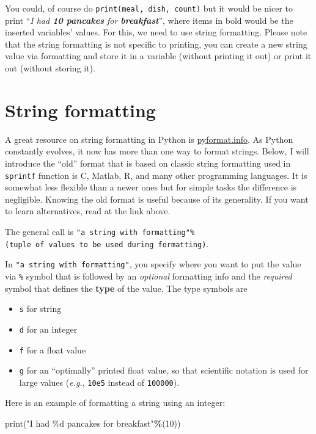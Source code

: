\documentclass[
]{book}
\newenvironment{Shaded}{\begin{snugshade}}{\end{snugshade}}
\newcommand{\BuiltInTok}[1]{#1}
\newcommand{\DecValTok}[1]{\textcolor[rgb]{0.00,0.00,0.81}{#1}}
\newcommand{\NormalTok}[1]{#1}
\newcommand{\OperatorTok}[1]{\textcolor[rgb]{0.81,0.36,0.00}{\textbf{#1}}}
\newcommand{\SpecialCharTok}[1]{\textcolor[rgb]{0.00,0.00,0.00}{#1}}
\newcommand{\StringTok}[1]{\textcolor[rgb]{0.31,0.60,0.02}{#1}}
\providecommand{\tightlist}{%
  \setlength{\itemsep}{0pt}\setlength{\parskip}{0pt}}
\begin{document}
You could, of course do \texttt{print(meal,\ dish,\ count)} but it would be nicer to print ``\emph{I had \textbf{10 pancakes} for \textbf{breakfast}}'', where items in bold would be the inserted variables' values. For this, we need to use string formatting. Please note that the string formatting is not specific to printing, you can create a new string value via formatting and store it in a variable (without printing it out) or print it out (without storing it).

\hypertarget{string-formatting}{%
\section{String formatting}\label{string-formatting}}

A great resource on string formatting in Python is \href{https://pyformat.info/}{pyformat.info}. As Python constantly evolves, it now has more than one way to format strings. Below, I will introduce the ``old'' format that is based on classic string formatting used in \texttt{sprintf} function is C, Matlab, R, and many other programming languages. It is somewhat less flexible than a newer ones but for simple tasks the difference is negligible. Knowing the old format is useful because of its generality. If you want to learn alternatives, read at the link above.

The general call is \texttt{"a\ string\ with\ formatting"\%(tuple\ of\ values\ to\ be\ used\ during\ formatting)}.

In \texttt{"a\ string\ with\ formatting"}, you specify where you want to put the value via \texttt{\%} symbol that is followed by an \emph{optional} formatting info and the \emph{required} symbol that defines the \textbf{type} of the value. The type symbols are

\begin{itemize}
\tightlist
\item
  \texttt{s} for string
\item
  \texttt{d} for an integer
\item
  \texttt{f} for a float value
\item
  \texttt{g} for an ``optimally'' printed float value, so that scientific notation is used for large values (\emph{e.g.}, \texttt{10e5} instead of \texttt{100000}).
\end{itemize}

Here is an example of formatting a string using an integer:

\begin{Shaded}
\begin{Highlighting}[]
\BuiltInTok{print}\NormalTok{(}\StringTok{"I had }\SpecialCharTok{\%d}\StringTok{ pancakes for breakfast"}\OperatorTok{\%}\NormalTok{(}\DecValTok{10}\NormalTok{))}
\end{Highlighting}
\end{Shaded}
\end{document}
